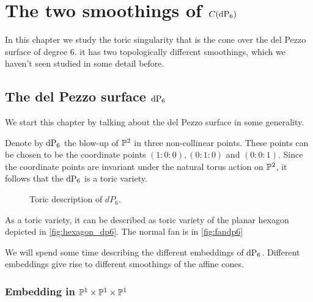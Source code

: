 \chapter{The two smoothings of \texorpdfstring{$C(\dP6)$}{C(dP6)}}
\label{chap:smoothings}

In this chapter we study the toric singularity that is the cone over the del Pezzo surface of degree $6$. it has two topologically different smoothings, which we haven't seen studied in some detail before. 

\section{The del Pezzo surface \texorpdfstring{$\dP6$}{dP6}}
\label{sec:twosmoothings}

We start this chapter by talking about the del Pezzo surface in some generality. 

Denote by $\dP6$ the blow-up of $\P^2$ in three non-collinear points.  These points can be chosen to be the coordinate points $(1:0:0),(0:1:0)$ and $(0:0:1)$. Since the coordinate points are invariant under the natural torus action on $\P^2$, it follows that the $\dP6$ is a toric variety.

\begin{figure}[b]
\centering 
{}
\caption{Toric description of $dP_6$.}
\end{figure}

As a toric variety, it can be described as toric variety of the planar hexagon depicted in \cref{fig:hexagon_dp6}. The normal fan is in \cref{fig:fandp6}

We will spend some time describing the different embeddings of $\dP6$. Different embeddings give rise to different smoothings of the affine cones.

\subsection{Embedding in $\P^1 \times \P^1 \times \P^1$}

